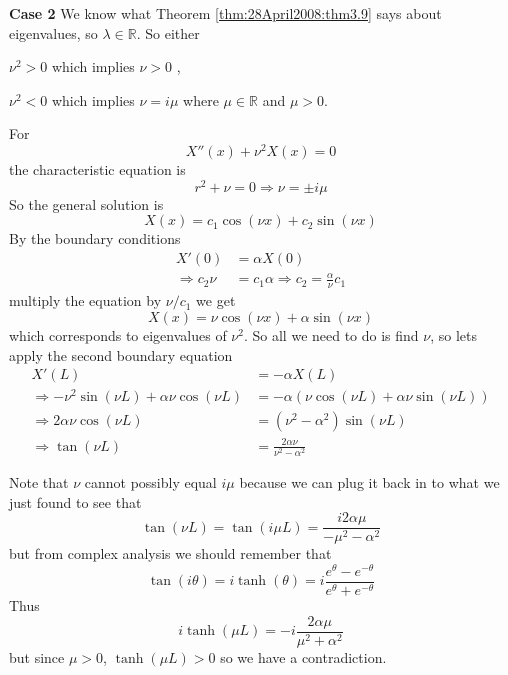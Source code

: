 \begin{ex}
\textbf{Case 2} We know what Theorem
\eqref{thm:28April2008:thm3.9} says about eigenvalues, so
$\lambda\in\mathbb{R}$. So either \begin{inparaenum}
\item $\nu^2>0$ which implies $\nu>0$%
, \item $\nu^2<0$ which implies $\nu=i\mu$
  where $\mu\in\mathbb{R}$ and $\mu>0$.\end{inparaenum} For
\begin{equation} 
X''(x)+\nu^2X(x) = 0
\end{equation}
the characteristic equation is
\begin{equation}
r^2 + \nu = 0\Rightarrow \nu=\pm i\mu
\end{equation}
So the general solution is
\begin{equation}
X(x) = c_{1}\cos(\nu x) + c_{2}\sin(\nu x)
\end{equation}
By the boundary conditions
\begin{align*}
X'(0) &= \alpha X(0)\\
\Rightarrow c_{2}\nu &= c_{1}\alpha\Rightarrow c_{2} = \frac{\alpha}{\nu}c_{1}
\end{align*}
multiply the equation by $\nu/c_1$ we get
\begin{equation}
X(x) = \nu\cos(\nu x) + \alpha\sin(\nu x)
\end{equation}
which corresponds to eigenvalues of $\nu^2$. So all we need
to do is find $\nu$, so lets apply the second boundary
equation
\begin{subequations}
\begin{align}
X'(L) &= -\alpha X(L)\\
\Rightarrow -\nu^2\sin(\nu L)+\alpha\nu\cos(\nu L) &= -\alpha\left(\nu\cos(\nu L)+\alpha\nu\sin(\nu L)\right)\\
\Rightarrow 2\alpha\nu\cos(\nu L) &= (\nu^2-\alpha^2)\sin(\nu L)\\
\Rightarrow \tan(\nu L) &= \frac{2\alpha\nu}{\nu^2-\alpha^2}
\end{align}
\end{subequations}
\end{ex}

\begin{rmk}
Note that $\nu$ cannot possibly equal $i\mu$ because we can
plug it back in to what we just found to see that
\begin{equation}
\tan(\nu L) = \tan(i\mu L) =
\frac{i2\alpha\mu}{-\mu^2-\alpha^2}
\end{equation}
but from complex analysis we should remember that
\begin{equation}
\tan(i\theta) = i\tanh(\theta) = i\frac{e^{\theta}-e^{-\theta}}{e^{\theta}+e^{-\theta}}
\end{equation}
Thus
\begin{equation}
i\tanh(\mu L) = -i\frac{2\alpha\mu}{\mu^2+\alpha^2}
\end{equation}
but since $\mu>0$, $\tanh(\mu L)>0$ so we have a
contradiction. 
\end{rmk}
